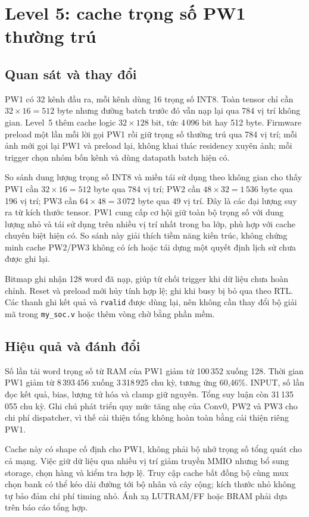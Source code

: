 \section{Level 5: cache trọng số PW1 thường trú}
\subsection{Quan sát và thay đổi}
PW1 có 32 kênh đầu ra, mỗi kênh dùng 16 trọng số INT8. Toàn tensor chỉ cần $32\times16=512$ byte nhưng đường batch trước đó vẫn nạp lại qua 784 vị trí không gian. Level~5 thêm cache logic $32\times128$ bit, tức 4\,096 bit hay 512 byte. Firmware preload một lần mỗi lời gọi PW1 rồi giữ trọng số thường trú qua 784 vị trí; mỗi ảnh mới gọi lại PW1 và preload lại, không khai thác residency xuyên ảnh; mỗi trigger chọn nhóm bốn kênh và dùng datapath batch hiện có.

So sánh dung lượng trọng số INT8 và miền tái sử dụng theo không gian cho thấy PW1 cần $32\times16=512$ byte qua 784 vị trí; PW2 cần $48\times32=1\,536$ byte qua 196 vị trí; PW3 cần $64\times48=3\,072$ byte qua 49 vị trí. Đây là các đại lượng suy ra từ kích thước tensor. PW1 cung cấp cơ hội giữ toàn bộ trọng số với dung lượng nhỏ và tái sử dụng trên nhiều vị trí nhất trong ba lớp, phù hợp với cache chuyên biệt hiện có. So sánh này giải thích tiềm năng kiến trúc, không chứng minh cache PW2/PW3 không có ích hoặc tái dựng một quyết định lịch sử chưa được ghi lại.

Bitmap ghi nhận 128 word đã nạp, giúp từ chối trigger khi dữ liệu chưa hoàn chỉnh. Reset và preload mới hủy tính hợp lệ; ghi khi busy bị bỏ qua theo RTL. Các thanh ghi kết quả và \texttt{rvalid} được dùng lại, nên không cần thay đổi bộ giải mã trong \texttt{my\_soc.v} hoặc thêm vòng chờ bằng phần mềm.

\subsection{Hiệu quả và đánh đổi}
Số lần tải word trọng số từ RAM của PW1 giảm từ 100\,352 xuống 128. Thời gian PW1 giảm từ 8\,393\,456 xuống 3\,318\,925 chu kỳ, tương ứng 60,46\%. INPUT, số lần đọc kết quả, bias, lượng tử hóa và clamp giữ nguyên. Tổng suy luận còn 31\,135\,055 chu kỳ. Ghi chú phát triển quy mức tăng nhẹ của Conv0, PW2 và PW3 cho chi phí dispatcher, vì thế cải thiện tổng không hoàn toàn bằng cải thiện riêng PW1.

Cache này có shape cố định cho PW1, không phải bộ nhớ trọng số tổng quát cho cả mạng. Việc giữ dữ liệu qua nhiều vị trí giảm truyền MMIO nhưng bổ sung storage, chọn hàng và kiểm tra hợp lệ. Truy cập cache bất đồng bộ cùng mux chọn bank có thể kéo dài đường tới bộ nhân và cây cộng; kích thước nhỏ không tự bảo đảm chi phí timing nhỏ. Ánh xạ LUTRAM/FF hoặc BRAM phải dựa trên báo cáo tổng hợp.

